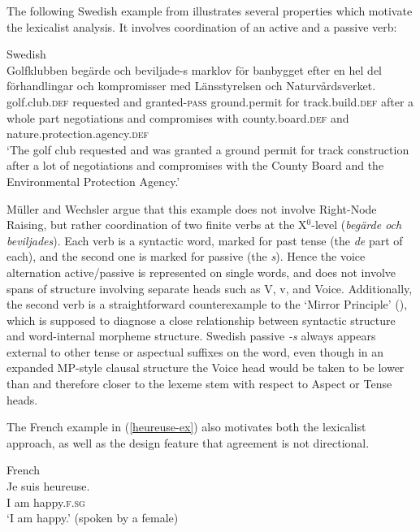 \documentclass[output=paper,hidelinks]{langscibook}
\begin{document}
The following Swedish example from \citet[29]{mullerwechsler14}
illustrates several properties which motivate the lexicalist
analysis. It involves coordination of an active and a passive verb:

\ea Swedish\\
\gll
Golfklubben begärde och beviljade-s marklov för banbygget efter en hel
del förhandlingar och kompromisser med Länsstyrelsen och
Naturvårdsverket.\\ 
golf.club.\textsc{def} requested and granted-\textsc{pass}
ground.permit for track.build.\textsc{def} after a whole part
negotiations and compromises with county.board.\textsc{def} and
nature.protection.agency.\textsc{def}\\%
\glt
`The golf club requested and was granted a ground permit for track
construction after a lot of negotiations and compromises with the
County Board and the Environmental Protection Agency.'
\z

M\"uller and Wechsler argue that this example does not involve
Right-Node Raising, but rather coordination of two finite verbs at the
X$^0$-level (\textit{begärde och beviljades}). Each verb is a
syntactic word, marked for past tense (the \textit{de} part of each),
and the second one is marked for passive (the \textit{s}). Hence the
voice alternation active/passive is represented on single words, and
does not involve spans of structure involving separate heads such as
V, v, and Voice. Additionally, the second verb is a straightforward
counterexample to the `Mirror Principle' (\citealp{baker85}), which is
supposed to diagnose a close relationship between syntactic structure
and word-internal morpheme structure. Swedish passive {\it -s\/}
always appears external to other tense or aspectual suffixes on the
word, even though in an expanded MP-style clausal structure the Voice
head would be taken to be lower than and therefore closer to the
lexeme stem with respect to Aspect or Tense heads.

The French example in (\ref{heureuse-ex}) also motivates both the
lexicalist approach, as well as the design feature that agreement is
not directional.

\ea\label{heureuse-ex} French\\
\gll
Je suis heureuse.\\
I am happy.\textsc{f.sg}\\
\glt
`I am happy.' (spoken by a female)
\z
\end{document}
